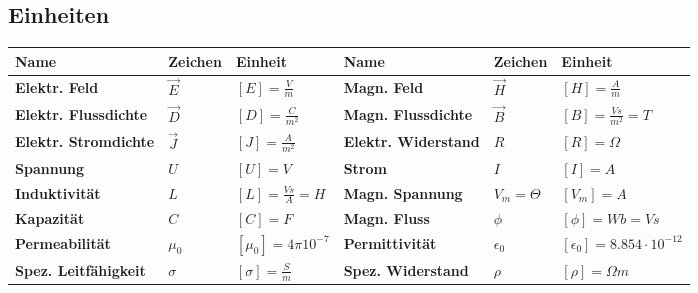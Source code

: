 \subsection{Einheiten}
\renewcommand{\arraystretch}{1.5}
\begin{tabular}{|p{3.5cm}|p{1.5cm}|p{3cm}||p{3.5cm}|p{1.5cm}|p{3.2cm}|}
	\hline
	\textbf{Name}			&\textbf{Zeichen} & \textbf{Einheit}&
	\textbf{Name}			&\textbf{Zeichen} & \textbf{Einheit}\\
	\hline
	\textbf{Elektr. Feld} 	& $\vec{E}$	& $[E] = \frac{V}{m}$&	
	\textbf{Magn. Feld}		& $\vec{H}$ & $[H] = \frac{A}{m}$\\
	\hline
	\textbf{Elektr. Flussdichte}&$\vec{D}$&$[D] = \frac{C}{m^2}$&
	\textbf{Magn. Flussdichte}&$\vec{B}$&$[B] = \frac{Vs}{m^2}=T$\\
	\hline
	\textbf{Elektr. Stromdichte} &$\vec{J}$& $[J]=\frac{A}{m^2}$&
	\textbf{Elektr. Widerstand} &$R$ &$[R]=\Omega$\\
	\hline
	\textbf{Spannung}&$U$&$[U]=V$&
	\textbf{Strom}&$I$&$[I]=A$\\
	\hline
	\textbf{Induktivität}&$L$&$[L]=\frac{Vs}{A}=H$&
	\textbf{Magn. Spannung}&$V_{m}=\Theta$&$[V_{m}]=A$\\
	\hline
	\textbf{Kapazität}&$C$&$[C]=F$&
	\textbf{Magn. Fluss}&$\phi$&$[\phi]=Wb=Vs$\\
	\hline
	\textbf{Permeabilität}&$\mu_{0} $&$[\mu_{0}]=4\pi 10^{-7}$&
	\textbf{Permittivität}&$\epsilon_{0}$&$[\epsilon_{0}]=8.854\cdot 10^{-12}$\\
	\hline
	\textbf{Spez. Leitfähigkeit}&$\sigma$&$[\sigma]=\frac{S}{m}$&
	\textbf{Spez. Widerstand}&$\rho $&$[\rho]=\Omega m $\\
	\hline
\end{tabular}

\clearpage
\pagebreak